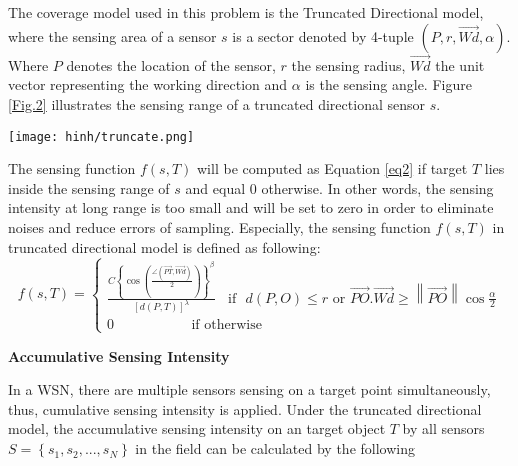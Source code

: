 \documentclass[final]{elsarticle}
\begin{document}
The coverage model used in this problem is the Truncated Directional model, where the sensing area of a sensor $ s $ is a sector denoted by 4-tuple $( P, r, \overrightarrow{Wd}, \alpha )$. Where $ P $ denotes the location of the sensor, $ r $ the sensing radius, $ \overrightarrow{Wd}$ the unit vector representing the working direction and $ \alpha $ is the sensing angle. Figure \ref{Fig.2} illustrates the sensing range of a truncated directional sensor $ s $. 
\begin{figure*}[h]
	\centering
	\texttt{[image: hinh/truncate.png]}
	\caption{Sensing capability of Truncated Directional sensor}
	\label{Fig.2}       %
\end{figure*}
The sensing function $f(s,T)$ will be computed as Equation \ref{eq2} if target $T$ lies inside the sensing range of $s$ and equal $0$ otherwise. In other words, the sensing intensity at long range is too small and will be set to zero in order to eliminate noises and reduce errors of sampling. Especially, the sensing function $f(s,T)$ in truncated directional model is defined as following:
\begin{equation}
\label{eq3}
f({s},T) = \left\{
\begin{aligned}
 \frac {{C{{\left\{ {\cos \left( {\frac{{\angle (\overrightarrow {PT} ,\overrightarrow {Wd}) }}{2}} \right)} \right\}}}^\beta }} {{{{\left[ {d(P,T)} \right]}^\lambda }}} \:\:\:\:\text{if} \:\:\: d(P,O) \le r \text{ or } \overrightarrow {PO} .\overrightarrow {Wd}  \ge \left\| {\overrightarrow {PO} } \right\|\cos \frac{\alpha}{2} \\
 0 \:\:\:\:\:\:\:\:\:\:\:\:\:\:\:\:\:\:\:\:\:\:\:\:\:\text{if  otherwise}\:\:\:\:\:\:\:\:\:\:\:\:\:\:\:\:\:\:\:\:\:\:\:\:\:\:\:\:\:\:\:\:\:\:\:\:\:\:\:\:\:\:\:\:\:\:\:\:\:\:\:\:\:\:\:\:\:\:
\end{aligned}
\right.
\end{equation}

\noindent\textbf{Accumulative Sensing Intensity}

In a WSN, there are multiple sensors sensing on a target point simultaneously, thus, cumulative sensing intensity is applied. Under the truncated directional model, the accumulative sensing intensity on an target object $ T $ by all sensors $S = \left\{ {{s_1},{s_2},...,{s_N}} \right\}$ in the field can be calculated by the following
\end{document}
